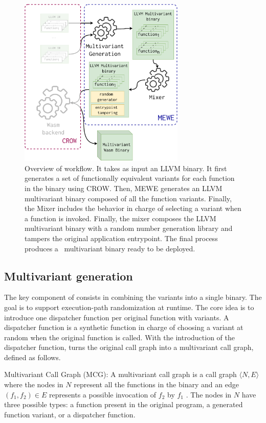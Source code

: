 \begin{figure}
  \centering
  \includegraphics[height=3.2in]{diagrams/MEWE.pdf}
  \caption{Overview of \tool workflow. It takes as input an LLVM binary. It first generates a set of functionally equivalent variants for each function in the binary using CROW. Then, MEWE generates an LLVM multivariant binary composed of all the function variants. Finally, the Mixer includes the behavior in charge of selecting a variant when a function is invoked. Finally, the \tool mixer composes the LLVM multivariant binary with a random number generation library and tampers the original application entrypoint. The final process produces a \wasm\ multivariant binary ready to be deployed. }
  \label{workflow}
\end{figure}


\subsection{Multivariant generation}


The key component of \tool consists in combining the variants into a single binary.
The goal is to support execution-path randomization at runtime.
The core idea is to introduce one dispatcher function per original function with variants.
A dispatcher function is a synthetic function in charge of choosing a variant at random when the original function is called.
With the introduction of the dispatcher function,  \tool turns the original call graph into a multivariant call graph, defined as follows. 

\begin{definition}{Multivariant Call Graph (MCG):}\label{def:EP}
    A multivariant call graph is a call graph $\langle N, E \rangle$ where the nodes in $N$ represent all the functions in the binary and an edge $(f_1,f_2) \in E$ represents a possible invocation of $f_2$ by $f_1$  \cite{ryder1979}. The nodes in $N$ have three possible types: a function present in the original program,  a generated function variant, or a dispatcher function.
\end{definition}


